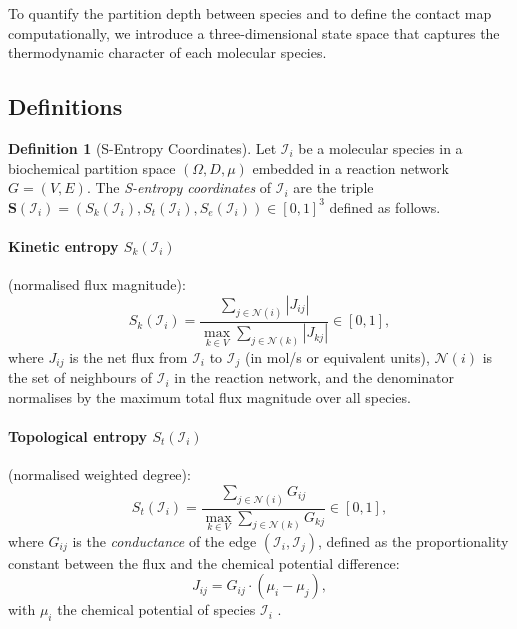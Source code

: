 \documentclass[11pt,twocolumn]{article}
\theoremstyle{plain}
\theoremstyle{definition}
\newtheorem{definition}[theorem]{Definition}
\newcommand{\Sk}{S_k}
\newcommand{\St}{S_t}
\newcommand{\Se}{S_e}
\newcommand{\bS}{\mathbf{S}}
\begin{document}
To quantify the partition depth between species and to define the contact map
computationally, we introduce a three-dimensional state space that captures the
thermodynamic character of each molecular species.

\subsection{Definitions}

\begin{definition}[S-Entropy Coordinates]
\label{def:sentropy_coords}
Let $\mathcal{I}_i$ be a molecular species in a biochemical partition space
$(\Omega, D, \mu)$ embedded in a reaction network $G = (V, E)$. The
\emph{S-entropy coordinates} of $\mathcal{I}_i$ are the triple
$\bS(\mathcal{I}_i) = (\Sk(\mathcal{I}_i), \St(\mathcal{I}_i),
\Se(\mathcal{I}_i)) \in [0,1]^3$ defined as follows.

\paragraph{Kinetic entropy $\Sk(\mathcal{I}_i)$} (normalised flux magnitude):
\begin{equation}\label{eq:Sk}
  \Sk(\mathcal{I}_i)
  = \frac{\displaystyle\sum_{j \in \mathcal{N}(i)} |J_{ij}|}
         {\displaystyle\max_{k \in V} \sum_{j \in \mathcal{N}(k)} |J_{kj}|}
  \in [0,1],
\end{equation}
where $J_{ij}$ is the net flux from $\mathcal{I}_i$ to $\mathcal{I}_j$
(in mol/s or equivalent units), $\mathcal{N}(i)$ is the set of neighbours of
$\mathcal{I}_i$ in the reaction network, and the denominator normalises by the
maximum total flux magnitude over all species.

\paragraph{Topological entropy $\St(\mathcal{I}_i)$} (normalised weighted degree):
\begin{equation}\label{eq:St}
  \St(\mathcal{I}_i)
  = \frac{\displaystyle\sum_{j \in \mathcal{N}(i)} G_{ij}}
         {\displaystyle\max_{k \in V} \sum_{j \in \mathcal{N}(k)} G_{kj}}
  \in [0,1],
\end{equation}
where $G_{ij}$ is the \emph{conductance} of the edge $(\mathcal{I}_i,
\mathcal{I}_j)$, defined as the proportionality constant between the flux
and the chemical potential difference:
\begin{equation}\label{eq:conductance}
  J_{ij} = G_{ij} \cdot (\mu_i - \mu_j),
\end{equation}
with $\mu_i$ the chemical potential of species $\mathcal{I}_i$
\cite{onsager1931reciprocal, kondepudi2014modern}.


\end{definition}
\end{document}
